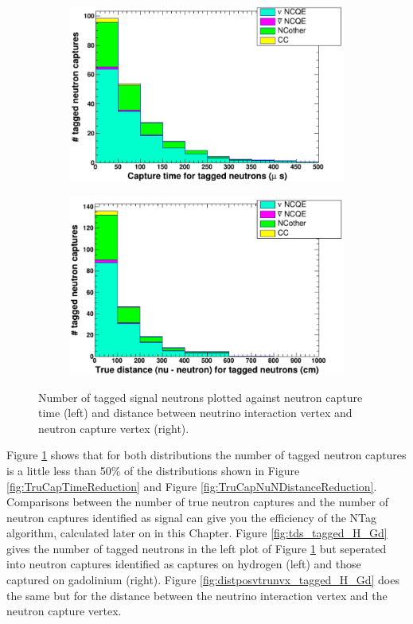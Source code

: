 \begin{figure}
    \centering
     \begin{subfigure}[b]{0.49\linewidth}
      \includegraphics[width=\linewidth]{Figures/tds_tagged_neutrons.PNG}
     \end{subfigure}
     \begin{subfigure}[b]{0.49\linewidth}
       \includegraphics[width=\linewidth]{Figures/distposvtrunvcx_tagged_neutrons.PNG}
      \end{subfigure} 
      \caption{Number of tagged signal neutrons plotted against neutron capture time (left) and distance between neutrino interaction vertex and neutron capture vertex (right).}
      \label{fig:tagged_neutrons_plot} 
\end{figure}

Figure \ref{fig:tagged_neutrons_plot} shows that for both distributions the number of tagged neutron captures is a little less than 50\% of the distributions shown in Figure \ref{fig:TruCapTimeReduction} and Figure \ref{fig:TruCapNuNDistanceReduction}. Comparisons between the number of true neutron captures and the number of neutron captures identified as signal can give you the efficiency of the NTag algorithm, calculated later on in this Chapter. Figure \ref{fig:tds_tagged_H_Gd} gives the number of tagged neutrons in the left plot of Figure \ref{fig:tagged_neutrons_plot} but seperated into neutron captures identified as captures on hydrogen (left) and those captured on gadolinium (right). Figure \ref{fig:distposvtrunvx_tagged_H_Gd} does the same but for the distance between the neutrino interaction vertex and the neutron capture vertex.

